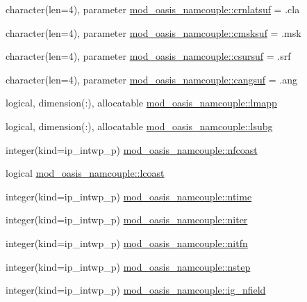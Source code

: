 \begin{DoxyCompactItemize}
\item 
character(len=4), parameter \hyperlink{namespacemod__oasis__namcouple_acdc7f0d582616ee9e18470aad433ed3a}{mod\+\_\+oasis\+\_\+namcouple\+::crnlatsuf} = \textquotesingle{}.cla\textquotesingle{}
\item 
character(len=4), parameter \hyperlink{namespacemod__oasis__namcouple_aeea3ba680d5ba05a432c12d64c68c8af}{mod\+\_\+oasis\+\_\+namcouple\+::cmsksuf} = \textquotesingle{}.msk\textquotesingle{}
\item 
character(len=4), parameter \hyperlink{namespacemod__oasis__namcouple_adf2c151a84c37bd7cd93867305b4f70b}{mod\+\_\+oasis\+\_\+namcouple\+::csursuf} = \textquotesingle{}.srf\textquotesingle{}
\item 
character(len=4), parameter \hyperlink{namespacemod__oasis__namcouple_a4b921aeee4d921557ab0cd2f0e541dad}{mod\+\_\+oasis\+\_\+namcouple\+::cangsuf} = \textquotesingle{}.ang\textquotesingle{}
\item 
logical, dimension(\+:), allocatable \hyperlink{namespacemod__oasis__namcouple_a8eca7c715a39c523e00ed2be0612950d}{mod\+\_\+oasis\+\_\+namcouple\+::lmapp}
\item 
logical, dimension(\+:), allocatable \hyperlink{namespacemod__oasis__namcouple_acda1605129987d656360e1ed81e8d199}{mod\+\_\+oasis\+\_\+namcouple\+::lsubg}
\item 
integer(kind=ip\+\_\+intwp\+\_\+p) \hyperlink{namespacemod__oasis__namcouple_a57f1b6f111a5257a4d6f5a4b18fa6250}{mod\+\_\+oasis\+\_\+namcouple\+::nfcoast}
\item 
logical \hyperlink{namespacemod__oasis__namcouple_a7657e0f9b495e291f26dc31b4f6145aa}{mod\+\_\+oasis\+\_\+namcouple\+::lcoast}
\item 
integer(kind=ip\+\_\+intwp\+\_\+p) \hyperlink{namespacemod__oasis__namcouple_a8a962108487c3ca092633bd4292dbfd6}{mod\+\_\+oasis\+\_\+namcouple\+::ntime}
\item 
integer(kind=ip\+\_\+intwp\+\_\+p) \hyperlink{namespacemod__oasis__namcouple_a6246780a56635119fd8f7935456b06cf}{mod\+\_\+oasis\+\_\+namcouple\+::niter}
\item 
integer(kind=ip\+\_\+intwp\+\_\+p) \hyperlink{namespacemod__oasis__namcouple_a1e5b5efd046e5ab959fba026bd645945}{mod\+\_\+oasis\+\_\+namcouple\+::nitfn}
\item 
integer(kind=ip\+\_\+intwp\+\_\+p) \hyperlink{namespacemod__oasis__namcouple_a66c36f23a77081749dc9e7993b0277f3}{mod\+\_\+oasis\+\_\+namcouple\+::nstep}
\item 
integer(kind=ip\+\_\+intwp\+\_\+p) \hyperlink{namespacemod__oasis__namcouple_a674f201daa7f2e1ba4c71221bda91d9c}{mod\+\_\+oasis\+\_\+namcouple\+::ig\+\_\+nfield}

\end{DoxyCompactItemize}
